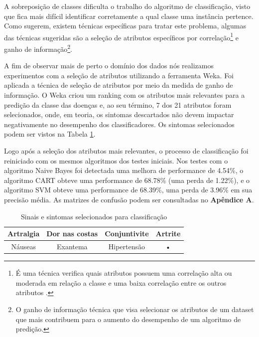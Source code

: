 A sobreposição de classes dificulta o trabalho do algoritmo de classificação, visto que fica mais difícil identificar corretamente a qual classe uma instância pertence. Como  sugerem, existem técnicas específicas para tratar este problema, algumas das técnicas sugeridas são a seleção de atributos específicos por correlação\footnote{É uma técnica verifica quais atributos possuem uma correlação alta ou moderada em relação a classe e uma baixa correlação entre os outros atributos .} e ganho de informação\footnote{O ganho de informação técnica que visa selecionar os atributos de um dataset que mais contribuem para o aumento do desempenho de um algoritmo de predição.}.


A fim de observar mais de perto o domínio dos dados nós realizamos experimentos com a seleção de atributos utilizando a ferramenta Weka. Foi aplicada a técnica de seleção de atributos por meio da medida de ganho de informação. O Weka criou um ranking com os atributos mais relevantes para a predição da classe das doenças e, ao seu término,  7 dos 21 atributos foram selecionados, onde, em teoria, os sintomas descartados não devem impactar negativamente no desempenho dos classificadores. Os sintomas selecionados podem ser vistos na Tabela \ref{tab:7colunas}. 

Logo após a seleção dos atributos mais relevantes, o processo de classificação foi reiniciado com os mesmos algoritmos dos testes iniciais. Nos testes com o algoritmo Naive Bayes foi detectada uma melhora de performance de 4.54\%, o algoritmo CART obteve uma performance de 68.78\% (uma perda de 1.22\%), e o algoritmo SVM obteve uma performance de 68.39\%, uma perda de 3.96\% em sua precisão média. As matrizes de confusão podem ser consultadas no \textbf{Apêndice A}.


\begin{table}[h]
\begin{center}
\caption{\label{tab:7colunas}Sinais e sintomas selecionados para classificação}

\begin{tabular}{c|c|c|c}
\hline 
Artralgia & Dor nas costas & Conjuntivite & Artrite \\ 
\hline 
Náuseas & Exantema & Hipertensão & • \\ 
\hline 
\end{tabular} 


\end{center}
\end{table}
\newpage

